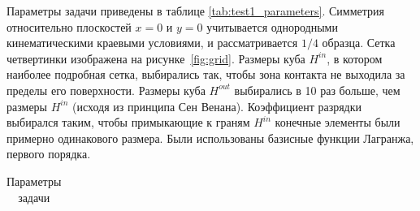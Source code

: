\documentclass[]{article}
\begin{document}
Параметры задачи приведены в таблице \ref{tab:test1_parameters}. Симметрия относительно плоскостей $x=0$ и $y=0$ учитывается однородными кинематическими краевыми условиями, и рассматривается $1/4$ образца. Сетка четвертинки изображена на \mbox{рисунке \ref{fig:grid}}. Размеры куба $H^{in}$, в котором наиболее подробная сетка, выбирались так, чтобы зона контакта не выходила за пределы его поверхности. Размеры куба $H^{out}$ выбирались в 10 раз больше, чем размеры $H^{in}$ (исходя из принципа Сен Венана). Коэффициент разрядки выбирался таким, чтобы примыкающие к граням $H^{in}$ конечные элементы были примерно одинакового размера. Были использованы базисные функции Лагранжа, первого порядка.


\begin{table}[h!]
	\caption{Параметры задачи}
	
	\begin{tabular}{|p{5.3cm}|c|p{7cm}|}
		

\end{tabular}
\end{table}
\end{document}
